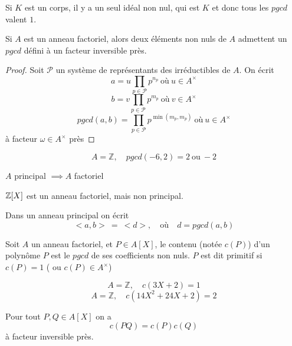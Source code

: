 \begin{remarque}
	Si $K$ est un corps, il y a un seul idéal non nul, qui est $K$ et donc
	tous les $pgcd$ valent $1$.
\end{remarque}

\begin{prop}
	Si $A$ est un anneau factoriel, alors deux éléments non nuls de $A$ admettent un $pgcd$ défini à un facteur inversible près.
\end{prop}

\begin{proof}
	Soit $\mathcal{P}$ un système de représentants des irréductibles de $A$.
	On écrit
	$$ a = u \prod\limits_{p \in \mathcal{P} } p^{n_p} \ \text{où}\  u \in A^\times $$
	$$ b = v \prod \limits_{p \in \mathcal{P} } p^{m_p} \ \text{où}\  v \in A^\times $$
	$$ pgcd(a,b)= \prod \limits_{p \in \mathcal{P}} p^{\min(m_p, m_p)}\  \text{où} \  u \in A^\times $$
	à facteur $\omega \in A^\times$ près
\end{proof}

\begin{example}
	$$A  = \mathbb{Z}, \quad  pgcd(-6,2) = 2\ \text{ou}\ -2$$
\end{example}

\begin{theorem}[admis]
	$A$ principal $\implies A$ factoriel
\end{theorem}

\begin{example}
	$\mathbb{Z}[X]$ est un anneau factoriel, mais non principal.
\end{example}

\begin{prop}
	Dans un anneau principal on écrit
	$$ <a,b> \ = \  <d>, \quad \text{où}\quad d = pgcd (a,b) $$
\end{prop}

\begin{definition}
	Soit $A$ un anneau factoriel, et $P \in A[X]$, le contenu (notée $c(P)$) d'un polynôme $P$ est le
	$pgcd$ de ses coefficients non nuls.
	$P$ est dit primitif si $c(P)=1$ ( ou $c(P) \in A^\times$)
\end{definition}


\begin{example}
	$$A  = \mathbb{Z}, \quad  c(3X + 2) = 1$$
	$$A  = \mathbb{Z}, \quad  c(14X^2 + 24X + 2) = 2$$
\end{example}


\begin{lemma}
	Pour tout $P,Q \in A[X]$ on a
	$$ c(PQ) = c(P)c(Q)$$
	à facteur inversible près.
\end{lemma}


